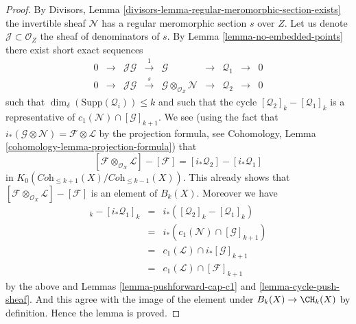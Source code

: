 \begin{proof}
\medskip\noindent
By Divisors, Lemma \ref{divisors-lemma-regular-meromorphic-section-exists}
the invertible sheaf $\mathcal{N}$ has a regular meromorphic section $s$
over $Z$. Let us denote $\mathcal{J} \subset \mathcal{O}_Z$ the sheaf
of denominators of $s$. By Lemma \ref{lemma-no-embedded-points}
there exist short exact sequences
$$
\begin{matrix}
0 &
\to &
\mathcal{J}\mathcal{G} &
\xrightarrow{1} &
\mathcal{G} &
\to &
\mathcal{Q}_1 &
\to &
0 \\
0 &
\to &
\mathcal{J}\mathcal{G} &
\xrightarrow{s} &
\mathcal{G} \otimes_{\mathcal{O}_Z} \mathcal{N} &
\to &
\mathcal{Q}_2 &
\to &
0
\end{matrix}
$$
such that $\dim_\delta(\text{Supp}(\mathcal{Q}_i)) \leq k$ and
such that the cycle
$
[\mathcal{Q}_2]_k - [\mathcal{Q}_1]_k
$
is a representative of $c_1(\mathcal{N}) \cap [\mathcal{G}]_{k + 1}$.
We see (using the fact that
$i_*(\mathcal{G} \otimes \mathcal{N}) = \mathcal{F} \otimes \mathcal{L}$
by the projection formula, see
Cohomology, Lemma \ref{cohomology-lemma-projection-formula})
that
$$
[\mathcal{F} \otimes_{\mathcal{O}_X} \mathcal{L}]
-
[\mathcal{F}]
=
[i_*\mathcal{Q}_2] - [i_*\mathcal{Q}_1]
$$
in $K_0(\textit{Coh}_{\leq k + 1}(X)/\textit{Coh}_{\leq k - 1}(X))$.
This already shows that
$[\mathcal{F} \otimes_{\mathcal{O}_X} \mathcal{L}] - [\mathcal{F}]$
is an element of $B_k(X)$. Moreover we have
\begin{eqnarray*}
[i_*\mathcal{Q}_2]_k - [i_*\mathcal{Q}_1]_k
& = &
i_*\left( [\mathcal{Q}_2]_k - [\mathcal{Q}_1]_k \right) \\
& = &
i_*\left(c_1(\mathcal{N}) \cap [\mathcal{G}]_{k + 1} \right) \\
& = &
c_1(\mathcal{L}) \cap i_*[\mathcal{G}]_{k + 1} \\
& = &
c_1(\mathcal{L}) \cap [\mathcal{F}]_{k + 1}
\end{eqnarray*}
by the above and Lemmas \ref{lemma-pushforward-cap-c1}
and \ref{lemma-cycle-push-sheaf}. And this agree with the
image of the element under $B_k(X) \to \CH_k(X)$ by definition.
Hence the lemma is proved.
\end{proof}








































